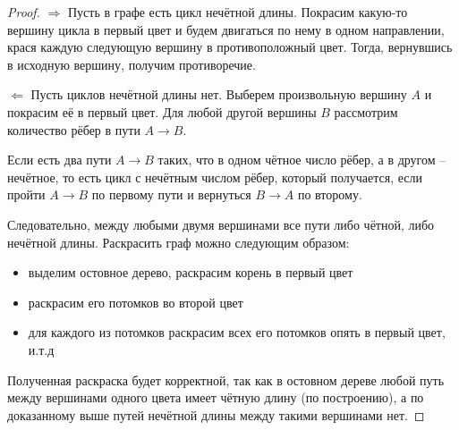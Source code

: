 \documentclass[a4paper,12pt]{article}
\begin{document}
    \begin{proof}
        \par $\Rightarrow$
        Пусть в графе есть цикл нечётной длины. Покрасим какую-то вершину цикла
        в первый цвет и будем двигаться по нему в одном направлении, крася
        каждую следующую вершину в противоположный цвет. Тогда, вернувшись в
        исходную вершину, получим противоречие.
        \par $\Leftarrow$
        Пусть циклов нечётной длины нет. Выберем произвольную вершину $A$ и
        покрасим её в первый цвет. Для любой другой вершины $B$ рассмотрим
        количество рёбер в пути $A\rightarrow B$.
        \par Если есть два пути $A\rightarrow B$ таких, что в одном чётное число
        рёбер, а в другом -- нечётное, то есть цикл с нечётным числом рёбер,
        который получается, если пройти $A\rightarrow B$ по первому пути и
        вернуться $B \rightarrow A$ по второму.
        \par Следовательно, между любыми двумя вершинами все пути либо чётной,
        либо нечётной длины. Раскрасить граф можно следующим образом:
        \begin{itemize}
            \item выделим остовное дерево, раскрасим корень в первый цвет
            \item раскрасим его потомков во второй цвет
            \item для каждого из потомков раскрасим всех его потомков опять в
                первый цвет, и.т.д
        \end{itemize}
        Полученная раскраска будет корректной, так как в остовном дереве
        любой путь между вершинами одного цвета имеет чётную длину (по
        построению), а по доказанному выше путей нечётной длины между такими
        вершинами нет.
    \end{proof}
\end{document}
